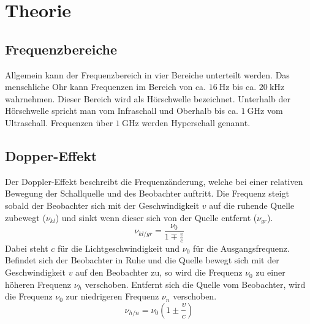 \section{Theorie}

\subsection{Frequenzbereiche}
Allgemein kann der Frequenzbereich in vier Bereiche unterteilt werden.
Das menschliche Ohr kann Frequenzen im Bereich von ca. $\SI{16}{\hertz}$ bis ca. $\SI{20}{\kilo\hertz}$ wahrnehmen.
Dieser Bereich wird als Hörschwelle bezeichnet.
Unterhalb der Hörschwelle spricht man vom Infraschall und Oberhalb bis ca. $\SI{1}{\giga\hertz}$ vom Ultraschall.
Frequenzen über $\SI{1}{\giga\hertz}$ werden Hyperschall genannt.

\subsection{Dopper-Effekt}
Der Doppler-Effekt beschreibt die Frequenzänderung, welche bei einer relativen Bewegung der Schallquelle und des Beobachter auftritt.
Die Frequenz steigt sobald der Beobachter sich mit der Geschwindigkeit $v$ auf die ruhende Quelle zubewegt ($\nu_{kl}$) und sinkt wenn dieser sich von der Quelle entfernt ($\nu_{gr}$).
\begin{equation}
    \nu_{kl/gr} = \frac{\nu_0}{1\mp \frac{v}{c}}
    \label{eqn:doppler_beobachter}
\end{equation}
Dabei steht $c$ für die Lichtgeschwindigkeit und $\nu_0$ für die Ausgangsfrequenz.
\\
Befindet sich der Beobachter in Ruhe und die Quelle bewegt sich mit der Geschwindigkeit $v$ auf den Beobachter zu, so wird die Frequenz $\nu_0$ zu einer höheren Frequenz $\nu_h$ verschoben.
Entfernt sich die Quelle vom Beobachter, wird die Frequenz $\nu_0$ zur niedrigeren Frequenz $\nu_n$ verschoben.
\begin{equation}
    \nu_{h/n} = \nu_0 \left ( 1 \pm \frac{v}{c}  \right )
    \label{eqn:doppler_quelle}
\end{equation}

